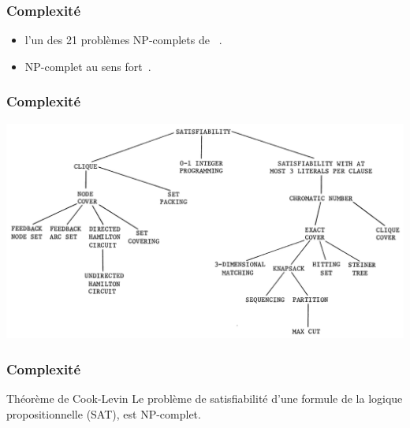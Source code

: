 \documentclass[aspectratio=169,11pt]{beamer}
\begin{document}

	\begin{frame}
		\frametitle{Complexité}
		\begin{block}{}
			\begin{itemize}
				\item l'un des 21 problèmes NP-complets de \citeauthor{Karp1972}~\cite{Karp1972}.
				\item NP-complet au sens fort~\cite{garey2002computers}.
			\end{itemize}
		\end{block}
		\begin{exampleblock}{}
		\end{exampleblock}
	\end{frame}

	\begin{frame}
		\frametitle{Complexité}
		\centering
		\includegraphics[width=0.9\linewidth]{karp_reduction_tree}%
	\end{frame}

	\begin{frame}
		\frametitle{Complexité}
		\begin{block}{Théorème de Cook-Levin}
			Le problème de satisfiabilité d'une formule de la logique propositionnelle (SAT), est NP-complet.
		\end{block}
		\begin{exampleblock}{}
			\fullcite{Cook1971}
		\end{exampleblock}
	\end{frame}

\end{document}
